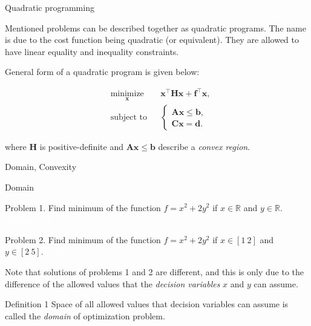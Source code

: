 \documentclass{beamer}
\begin{document}
\begin{frame}{Quadratic programming}
\begin{flushleft}

Mentioned problems can be described together as quadratic programs. The name is due to the cost function being quadratic (or equivalent). They are allowed to have linear equality and inequality constraints. 

\bigskip

General form of a quadratic program is given below:

%
\begin{equation}
\begin{aligned}
& \underset{\mathbf{x}}{\text{minimize}}
& & \mathbf{x}^\top \mathbf{H} \mathbf{x} + \mathbf{f}^\top\mathbf{x}, \\
& \text{subject to}
& & \begin{cases}
    \mathbf{A}\mathbf{x} \leq \mathbf{b}, \\
    \mathbf{C}\mathbf{x} = \mathbf{d}.
    \end{cases}
\end{aligned}
\end{equation}

where $\mathbf{H}$ is positive-definite and $\mathbf{A}\mathbf{x} \leq \mathbf{b}$ describe a \emph{convex region}.

\end{flushleft}
\end{frame}




\begin{frame}
	\centerline{\huge Domain, Convexity}
\end{frame}



\begin{frame}{Domain}
	\begin{flushleft}
		
		Problem 1. Find minimum of the function $f = x^2 + 2y^2$ if $x \in \mathbb{R}$ and $y \in \mathbb{R}$. \textcolor{white}{Solution is $x = 0$, $y = 0$.}
		
		\bigskip
		
		Problem 2. Find minimum of the function $f = x^2 + 2y^2$ if $x \in [1 \ 2]$ and $y \in [2 \ 5]$. \textcolor{white}{Solution is $x = 1$, $y = 2$.}
		
		\bigskip
		
		Note that solutions of problems 1 and 2 are different, and this is only due to the difference of the allowed values that the \emph{decision variables} $x$ and $y$ can assume.
		
		\begin{block}{Definition 1}
			Space of all allowed values that decision variables can assume is called the \emph{domain} of optimization problem.
		\end{block}
		
	\end{flushleft}
\end{frame}
\end{document}
